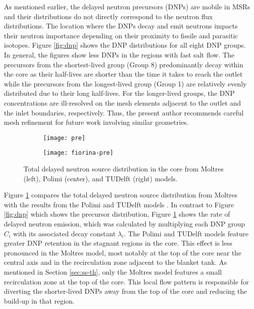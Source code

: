 As mentioned earlier, the delayed neutron precursors (DNPs) are mobile in
\glspl{MSR} and their distributions do not directly correspond to the neutron
flux distributions. The location where the \glspl{DNP} decay and emit neutrons
impacts their neutron
importance depending on their proximity to fissile and parasitic isotopes.
Figure \ref{fig:dnp} shows the \gls{DNP} distributions for all eight \gls{DNP}
groups. In general, the figures show less \glspl{DNP} in the regions with fast
salt flow. The
precursors from the shortest-lived group (Group 8) predominantly decay within
the core as their half-lives are shorter than the time it takes to reach the
outlet while the precursors from the longest-lived group (Group 1) are
relatively evenly distributed due to their long half-lives. For the
longer-lived groups, the \gls{DNP} concentrations are ill-resolved on the
mesh elements adjacent to the outlet and the inlet boundaries, respectively.
Thus, the present author recommends careful mesh refinement for future work
involving similar geometries.

\begin{figure}[b!]
    \centering
    \begin{subfigure}[t]{.30\textwidth}
        \centering
        \vspace{.9cm}
        \texttt{[image: pre]}
    \end{subfigure}
    \begin{subfigure}[t]{.69\textwidth}
        \centering
        \vspace{0pt}
        \texttt{[image: fiorina-pre]}
    \end{subfigure}
    \caption{Total delayed neutron source distribution in the core from
    Moltres (left), Polimi (center), and TUDelft (right) models.}
    \label{fig:pre}
\end{figure}

Figure \ref{fig:pre} compares the total delayed neutron source
distribution from Moltres with the results from the Polimi and TUDelft models
\cite{fiorina_modelling_2014}. In contrast to Figure \ref{fig:dnp} which shows
the precursor distribution, Figure \ref{fig:pre} shows the rate of delayed
neutron emission, which was calculated by multiplying each \gls{DNP} group
$C_i$ with its associated decay constant $\lambda_i$.
The Polimi and TUDelft models
feature greater \gls{DNP} retention in the stagnant regions in the core. This
effect is less pronounced in the Moltres model, most notably at the top of the
core near the central axis and in the recirculation zone adjacent to the
blanket tank. As mentioned in Section \ref{sec:ss-th}, only the Moltres model
features a small recirculation zone at the top of the core. This local flow
pattern is responsible for diverting the shorter-lived \glspl{DNP} away from
the top of the core and reducing the build-up in that region.

